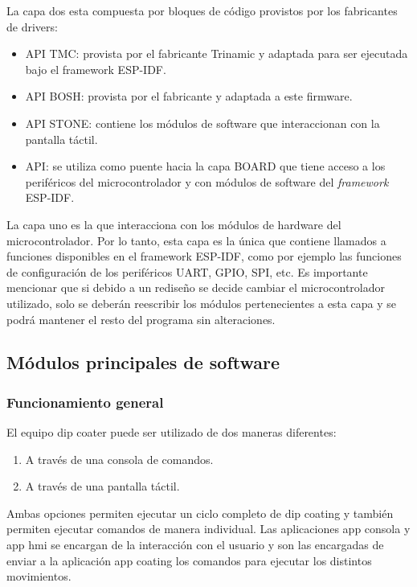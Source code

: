 La capa dos esta compuesta por bloques de código provistos por los fabricantes de drivers:
\begin{itemize}
\item API TMC: provista por el fabricante Trinamic y adaptada para ser ejecutada bajo el framework ESP-IDF.
\item API BOSH: provista por el fabricante y adaptada a este firmware.
\item API STONE: contiene los módulos de software que interaccionan con la pantalla táctil.
\item API: se utiliza como puente hacia la capa BOARD que tiene acceso a los periféricos del microcontrolador y con módulos de software del \textit{framework} ESP-IDF.

\end{itemize}

La capa uno es la que interacciona con los módulos de hardware del microcontrolador. Por lo tanto, esta capa es la única que contiene llamados a funciones disponibles en el framework ESP-IDF, como por ejemplo las funciones de configuración de los periféricos UART, GPIO, SPI, etc. Es importante mencionar que si debido a un rediseño se decide cambiar el microcontrolador utilizado, solo se deberán reescribir los módulos pertenecientes a esta capa y se podrá mantener el resto del programa sin alteraciones.

\subsection{Módulos principales de software}
\label{sec:modulos principales}

\subsubsection{Funcionamiento general}
 

El equipo dip coater puede ser utilizado de dos maneras diferentes:

\begin{enumerate}
\item A través de una consola de comandos.
\item A través de una pantalla táctil.
\end{enumerate}

Ambas opciones permiten ejecutar un ciclo completo de dip coating y también permiten ejecutar comandos de manera individual. Las aplicaciones app consola y app hmi se encargan de la interacción con el usuario y son las encargadas de enviar a la aplicación app coating los comandos para ejecutar los distintos movimientos.

